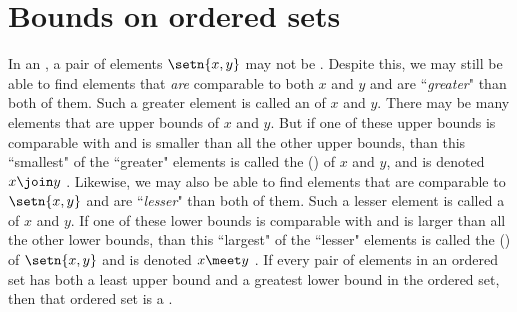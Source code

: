 \section{Bounds on ordered sets}
In an  , a pair of elements $\setn{x,y}$ may not be .
Despite this, we may still be able to find elements that {\em are}
comparable to both $x$ and $y$ and are ``{\em greater}" than both of them.
Such a greater element is called an  of $x$ and $y$.
There may be many elements that are upper bounds of $x$ and $y$.
But if one of these upper bounds is comparable with and is smaller than all the other upper bounds,
than this ``smallest" of the ``greater" elements is called the
 () of $x$ and $y$, and is denoted $x \join y$ .
Likewise, we may also be able to find elements that are
comparable to $\setn{x,y}$ and are ``{\em lesser}" than both of them.
Such a lesser element is called a  of $x$ and $y$.
If one of these lower bounds is comparable with and is larger than all the other lower bounds,
than this ``largest" of the ``lesser" elements is called the
 () of $\setn{x,y}$ and is denoted $x \meet y$ .
If every pair of elements in an ordered set has both a least upper bound and a greatest lower bound in the ordered set,
then that ordered set is a  .

